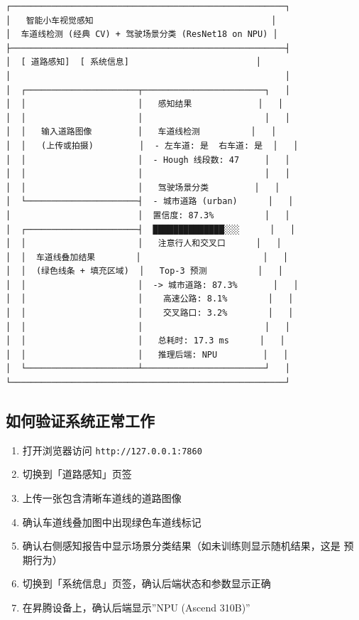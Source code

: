 \begin{lstlisting}
┌──────────────────────────────────────────────────────┐
│   智能小车视觉感知                                   │
│  车道线检测 (经典 CV) + 驾驶场景分类 (ResNet18 on NPU) │
├──────────────────────────────────────────────────────┤
│  [ 道路感知]  [ 系统信息]                         │
│                                                      │
│  ┌──────────────────────┬────────────────────────┐   │
│  │                      │   感知结果             │   │
│  │                      │                        │   │
│  │   输入道路图像         │   车道线检测          │   │
│  │   (上传或拍摄)         │  - 左车道: 是  右车道: 是  │   │
│  │                      │  - Hough 线段数: 47     │   │
│  │                      │                        │   │
│  │                      │   驾驶场景分类         │   │
│  └──────────────────────┤  - 城市道路 (urban)      │   │
│                         │  置信度: 87.3%          │   │
│  ┌──────────────────────┤  ██████████████░░░      │   │
│  │                      │   注意行人和交叉口      │   │
│  │  车道线叠加结果        │                        │   │
│  │  (绿色线条 + 填充区域)  │   Top-3 预测          │   │
│  │                      │  -> 城市道路: 87.3%       │   │
│  │                      │    高速公路: 8.1%        │   │
│  │                      │    交叉路口: 3.2%        │   │
│  │                      │                        │   │
│  │                      │   总耗时: 17.3 ms      │   │
│  │                      │   推理后端: NPU         │   │
│  └──────────────────────┴────────────────────────┘   │
└──────────────────────────────────────────────────────┘
\end{lstlisting}

\subsection{如何验证系统正常工作}\label{src-experiment-case6-h34}

\begin{enumerate}
\def\labelenumi{\arabic{enumi}.}
\tightlist
\item
  打开浏览器访问 \passthrough{\lstinline!http://127.0.0.1:7860!}
\item
  切换到「道路感知」页签
\item
  上传一张包含清晰车道线的道路图像
\item
  确认车道线叠加图中出现绿色车道线标记
\item
  确认右侧感知报告中显示场景分类结果（如未训练则显示随机结果，这是
  预期行为）
\item
  切换到「系统信息」页签，确认后端状态和参数显示正确
\item
  在昇腾设备上，确认后端显示''NPU (Ascend 310B)''
\end{enumerate}
